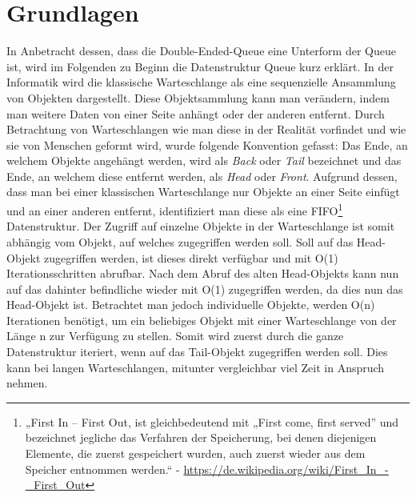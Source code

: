 \documentclass{TUBAFarbeiten}
\begin{document}
\section{Grundlagen}
In Anbetracht dessen, dass die Double-Ended-Queue eine Unterform der Queue ist, wird im Folgenden zu Beginn die Datenstruktur Queue kurz erklärt.\newline
In der Informatik wird die klassische Warteschlange als eine sequenzielle Ansammlung von Objekten dargestellt. Diese Objektsammlung kann man verändern, indem man weitere Daten von einer Seite anhängt oder der anderen entfernt. 
Durch Betrachtung von Warteschlangen wie man diese in der Realität vorfindet und wie sie von Menschen geformt wird, wurde folgende Konvention gefasst: Das Ende, an welchem Objekte angehängt werden, wird als \textit{Back} oder \textit{Tail} bezeichnet und das Ende, an welchem diese entfernt werden, als \textit{Head} oder \textit{Front}. 
Aufgrund dessen, dass man bei einer klassischen Warteschlange nur Objekte an einer Seite einfügt und an einer anderen entfernt, identifiziert man diese als eine FIFO\footnote{„First In – First Out, ist gleichbedeutend mit „First come, first served” und bezeichnet jegliche das Verfahren der Speicherung, bei denen diejenigen Elemente, die zuerst gespeichert wurden, auch zuerst wieder aus dem Speicher entnommen werden.“ - \url{https://de.wikipedia.org/wiki/First_In_-_First_Out}} Datenstruktur.
Der Zugriff auf einzelne Objekte in der Warteschlange ist somit abhängig vom Objekt, auf welches zugegriffen werden soll. Soll auf das Head-Objekt zugegriffen werden, ist dieses direkt verfügbar und mit O(1) Iterationsschritten abrufbar. Nach dem Abruf des alten Head-Objekts kann nun auf das dahinter befindliche wieder mit O(1) zugegriffen werden, da dies nun das Head-Objekt ist. Betrachtet man jedoch individuelle Objekte, werden O(n) Iterationen benötigt, um ein beliebiges Objekt mit einer Warteschlange von der Länge n zur Verfügung zu stellen. Somit wird zuerst durch die ganze Datenstruktur iteriert, wenn auf das Tail-Objekt zugegriffen werden soll. Dies kann bei langen Warteschlangen, mitunter vergleichbar viel Zeit in Anspruch nehmen.\newline
\end{document}
